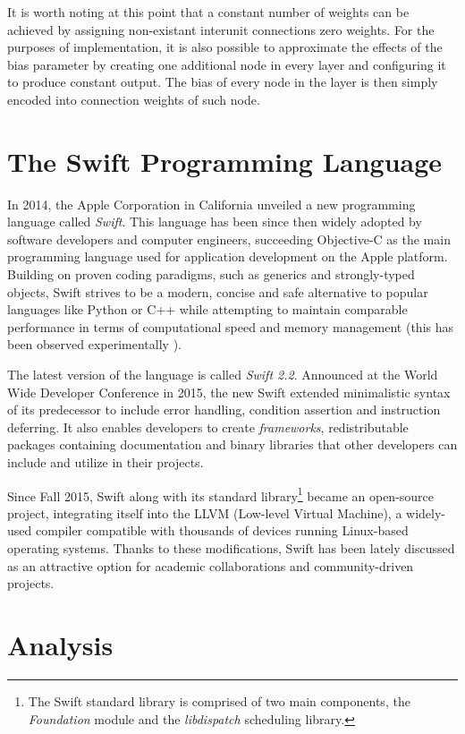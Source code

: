 It is worth noting at this point that a constant number of weights can be achieved by assigning non-existant interunit connections zero weights. For the purposes of implementation, it is also possible to approximate the effects of the bias parameter by creating one additional node in every layer and configuring it to produce constant output. The bias of every node in the layer is then simply encoded into connection weights of such node.

\section{The Swift Programming Language}
In 2014, the Apple Corporation in California unveiled a new programming language called \textit{Swift}. \cite{SwiftReference} This language has been since then widely adopted by software developers and computer engineers, succeeding Objective-C as the main programming language used for application development on the Apple platform. Building on proven coding paradigms, such as generics and strongly-typed objects, Swift strives to be a modern, concise and safe alternative to popular languages like Python or C++ while attempting to maintain comparable performance in terms of computational speed and memory management (this has been observed experimentally \cite{PrimateLabsBenchmark}).

The latest version of the language is called \textit{Swift 2.2}. Announced at the World Wide Developer Conference in 2015, the new Swift extended minimalistic syntax of its predecessor to include error handling, condition assertion and instruction deferring. It also enables developers to create \textit{frameworks}, redistributable packages containing documentation and binary libraries that other developers can include and utilize in their projects.

Since Fall 2015, Swift along with its standard library\footnote{The Swift standard library is comprised of two main components, the \textit{Foundation} module and the \textit{libdispatch} scheduling library.} became an open-source project, integrating itself into the LLVM (Low-level Virtual Machine), a widely-used compiler compatible with thousands of devices running Linux-based operating systems. Thanks to these modifications, Swift has been lately discussed as an attractive option for academic collaborations and community-driven projects.

\section{Analysis}
\todo

